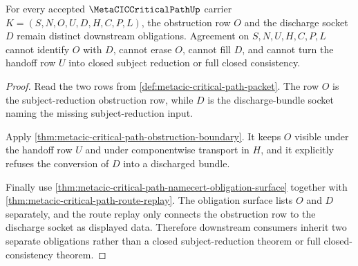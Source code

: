 \begin{theorem}
\label{thm:metacic-critical-path-obstruction-socket-separation}
For every accepted $\MetaCICCriticalPathUp$ carrier $K=(S,N,O,U,D,H,C,P,L)$, the obstruction row $O$ and the discharge socket $D$ remain distinct downstream obligations. Agreement on $S,N,U,H,C,P,L$ cannot identify $O$ with $D$, cannot erase $O$, cannot fill $D$, and cannot turn the handoff row $U$ into closed subject reduction or full closed consistency.
\end{theorem}
\begin{proof}
Read the two rows from \autoref{def:metacic-critical-path-packet}. The row $O$ is the subject-reduction obstruction row, while $D$ is the discharge-bundle socket naming the missing subject-reduction input.

Apply \autoref{thm:metacic-critical-path-obstruction-boundary}. It keeps $O$ visible under the handoff row $U$ and under componentwise transport in $H$, and it explicitly refuses the conversion of $D$ into a discharged bundle.

Finally use \autoref{thm:metacic-critical-path-namecert-obligation-surface} together with \autoref{thm:metacic-critical-path-route-replay}. The obligation surface lists $O$ and $D$ separately, and the route replay only connects the obstruction row to the discharge socket as displayed data. Therefore downstream consumers inherit two separate obligations rather than a closed subject-reduction theorem or full closed-consistency theorem.
\end{proof}

